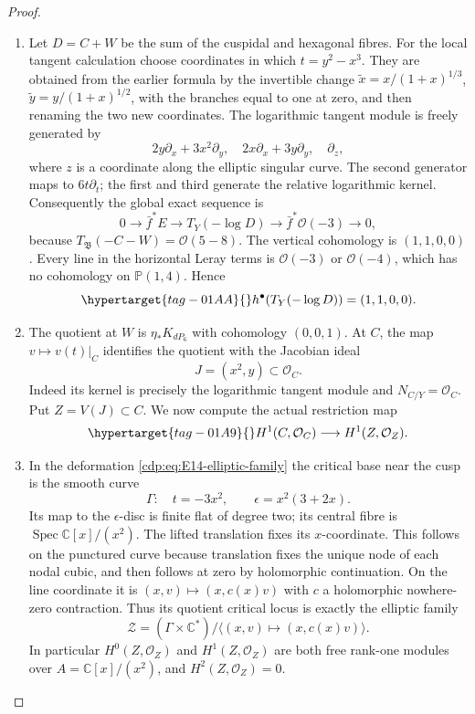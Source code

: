 \begin{proof}
\begin{enumerate}[label={$\langle1\rangle$\arabic*.},leftmargin=*]
\item Let $D=C+W$ be the sum of the cuspidal and hexagonal fibres.
For the local tangent calculation choose coordinates in which
$t=y^2-x^3$. They are obtained from the earlier formula by the
invertible change $\widetilde x=x/(1+x)^{1/3}$,
$\widetilde y=y/(1+x)^{1/2}$, with the branches equal to one at
zero, and then renaming the two new coordinates. The logarithmic
tangent module is freely generated by
\[
 2y\partial_x+3x^2\partial_y,\quad
 2x\partial_x+3y\partial_y,\quad\partial_z,
\]
where $z$ is a coordinate along the elliptic singular curve. The
second generator maps to $6t\partial_t$;
the first and third generate the relative logarithmic kernel.
Consequently the global exact sequence is
\[
 0\longrightarrow\bar f^*E\longrightarrow T_Y(-\log D)
 \longrightarrow\bar f^*\mathcal O(-3)\longrightarrow0,
\]
because $T_{\mathfrak B}(-C-W)=\mathcal O(5-8)$.
The vertical cohomology is $(1,1,0,0)$. Every line in the
horizontal Leray terms is $\mathcal O(-3)$ or $\mathcal O(-4)$,
which has no cohomology on $\mathbb P(1,4)$. Hence
\begin{equation}\hypertarget{tag-01AA}{}\label{cdp:eq:E14-log-coho}
 h^\bullet(T_Y(-\log D))=(1,1,0,0).
\end{equation}

\item The quotient at $W$ is $\eta_*K_{dP_6}$ with cohomology $(0,0,1)$.
At $C$, the map $v\mapsto v(t)|_C$ identifies the quotient with
the Jacobian ideal
\[
 J=(x^2,y)\subset\mathcal O_C.
\]
Indeed its kernel is precisely the logarithmic tangent module and
$N_{C/Y}=\mathcal O_C$. Put $Z=V(J)\subset C$. We now compute
the actual restriction map
\begin{equation}\hypertarget{tag-01A9}{}\label{cdp:eq:E14-jet-map}
 H^1(C,\mathcal O_C)\longrightarrow H^1(Z,\mathcal O_Z).
\end{equation}

\item In the deformation \eqref{cdp:eq:E14-elliptic-family} the critical
base near the cusp is the smooth curve
\[
 \Gamma:\quad t=-3x^2,\qquad
 \epsilon=x^2(3+2x).
\]
Its map to the $\epsilon$-disc is finite flat of degree two; its
central fibre is $\operatorname{Spec}\mathbb C[x]/(x^2)$.
The lifted translation fixes its $x$-coordinate. This follows on
the punctured curve because translation fixes the unique node of
each nodal cubic, and then follows at zero by holomorphic
continuation. On the line coordinate it is
$(x,v)\mapsto(x,c(x)v)$ with $c$ a holomorphic nowhere-zero
contraction. Thus its quotient critical locus is exactly the
elliptic family
\[
 \mathcal Z=(\Gamma\times\mathbb C^*)/
       \langle(x,v)\mapsto(x,c(x)v)\rangle.
\]
In particular $H^0(Z,\mathcal O_Z)$ and
$H^1(Z,\mathcal O_Z)$ are both free rank-one modules over
$A=\mathbb C[x]/(x^2)$, and $H^2(Z,\mathcal O_Z)=0$.


\end{enumerate}
\end{proof}
